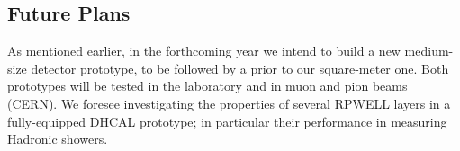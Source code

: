 \subsection{Future Plans}
As mentioned earlier, in the forthcoming year we intend to build a new medium-size detector prototype, to be followed by a prior to our square-meter one. Both prototypes will be tested in the laboratory and in muon and pion beams (CERN).
We foresee investigating the properties of several RPWELL layers in a fully-equipped DHCAL prototype; in particular their performance in measuring Hadronic showers.
